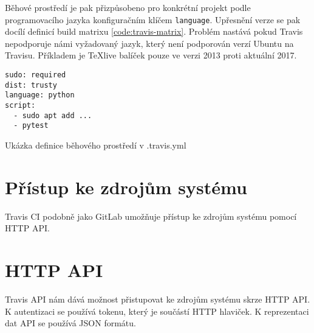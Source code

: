 Běhové prostředí je pak přizpůsobeno pro konkrétní projekt podle programovacího jazyka konfiguračním klíčem \verb|language|.
Upřesnění verze se pak docílí definicí build matrixu \ref{code:travis-matrix}.
Problém nastává pokud Travis nepodporuje námi vyžadovaný jazyk, který není podporován verzí Ubuntu na Travisu.
Příkladem je \TeX{}live balíček pouze ve verzi 2013 proti aktuální 2017.

\begin{listing}[ht]
\begin{verbatim}
sudo: required
dist: trusty
language: python
script:
  - sudo apt add ...
  - pytest
\end{verbatim}
\caption{Ukázka definice běhového prostředí v .travis.yml}
\end{listing}

\section{Přístup ke zdrojům systému}

Travis CI podobně jako GitLab umožňuje přístup ke zdrojům systému pomocí HTTP API.

\section{HTTP API}

Travis API nám dává možnost přistupovat ke zdrojům systému skrze HTTP API.
K autentizaci se používá tokenu, který je součástí HTTP hlaviček.
K reprezentaci dat API se používá JSON formátu.

